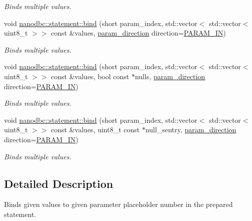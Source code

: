 \begin{DoxyCompactItemize}
\begin{DoxyCompactList}\small\item\em Binds multiple values. \end{DoxyCompactList}\item 
void \mbox{\hyperlink{group__bind__multi_gac04830aadf2e00d3a3d05af8690eb241}{nanodbc\+::statement\+::bind}} (short param\+\_\+index, std\+::vector$<$ std\+::vector$<$ uint8\+\_\+t $>$$>$ const \&values, \mbox{\hyperlink{classnanodbc_1_1statement_a523142f53cbbee8d68a074da993e7fa6}{param\+\_\+direction}} direction=\mbox{\hyperlink{classnanodbc_1_1statement_a523142f53cbbee8d68a074da993e7fa6ae33f42ce0677d00c291ff4d8e39f99de}{P\+A\+R\+A\+M\+\_\+\+IN}})
\begin{DoxyCompactList}\small\item\em Binds multiple values. \end{DoxyCompactList}\item 
void \mbox{\hyperlink{group__bind__multi_ga5242c1154450bfe699b73a2f26294560}{nanodbc\+::statement\+::bind}} (short param\+\_\+index, std\+::vector$<$ std\+::vector$<$ uint8\+\_\+t $>$$>$ const \&values, bool const $\ast$nulls, \mbox{\hyperlink{classnanodbc_1_1statement_a523142f53cbbee8d68a074da993e7fa6}{param\+\_\+direction}} direction=\mbox{\hyperlink{classnanodbc_1_1statement_a523142f53cbbee8d68a074da993e7fa6ae33f42ce0677d00c291ff4d8e39f99de}{P\+A\+R\+A\+M\+\_\+\+IN}})
\begin{DoxyCompactList}\small\item\em Binds multiple values. \end{DoxyCompactList}\item 
void \mbox{\hyperlink{group__bind__multi_ga72e3b3fea37e2e8456f4cf2b66aa21f2}{nanodbc\+::statement\+::bind}} (short param\+\_\+index, std\+::vector$<$ std\+::vector$<$ uint8\+\_\+t $>$$>$ const \&values, uint8\+\_\+t const $\ast$null\+\_\+sentry, \mbox{\hyperlink{classnanodbc_1_1statement_a523142f53cbbee8d68a074da993e7fa6}{param\+\_\+direction}} direction=\mbox{\hyperlink{classnanodbc_1_1statement_a523142f53cbbee8d68a074da993e7fa6ae33f42ce0677d00c291ff4d8e39f99de}{P\+A\+R\+A\+M\+\_\+\+IN}})
\begin{DoxyCompactList}\small\item\em Binds multiple values. \end{DoxyCompactList}\end{DoxyCompactItemize}


\subsection{Detailed Description}
Binds given values to given parameter placeholder number in the prepared statement. 


